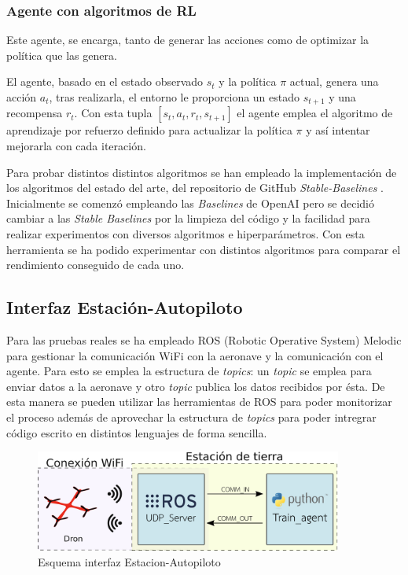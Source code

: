  \subsubsection{Agente con algoritmos de RL}
 Este agente, se encarga, tanto de generar las acciones como de optimizar la política que las genera.
 
 
 El agente, basado en el estado observado $s_t$ y la política $\pi$ actual, genera una acción $a_t$, tras realizarla, el entorno le proporciona un estado $s_{t+1}$ y una recompensa $r_t$.
 Con esta tupla $[s_t,a_t,r_t,s_{t+1}]$ el agente emplea el algoritmo de aprendizaje por refuerzo definido para actualizar la política $\pi$ y así intentar mejorarla con cada iteración. 

Para probar distintos distintos algoritmos se han empleado la implementación de los algoritmos del estado del arte, del repositorio de GitHub \textit{Stable-Baselines} \cite{stable-baselines}. Inicialmente se comenzó empleando las \textit{Baselines} de OpenAI \cite{OpenAIbaselines} pero se decidió cambiar a las \textit{Stable Baselines} por la limpieza del código y la facilidad para realizar experimentos con diversos algoritmos e hiperparámetros. Con esta herramienta se ha podido experimentar con distintos algoritmos para comparar el rendimiento conseguido de cada uno.


\subsection{Interfaz Estación-Autopiloto}

Para las pruebas reales se ha empleado ROS (Robotic Operative System) Melodic para gestionar la comunicación WiFi con la aeronave y la comunicación con el agente. Para esto se emplea la estructura de \textit{topics}: un \textit{topic} se emplea para enviar datos a la aeronave y otro \textit{topic} publica los datos recibidos por ésta. De esta manera se pueden utilizar las herramientas de ROS para poder monitorizar el proceso además de aprovechar la estructura de \textit{topics} para poder intregrar código escrito en distintos lenguajes de forma sencilla.

\begin{figure}[htb!]
	\centering
	\includegraphics[width=0.9\textwidth]{software/Arquitectura}
	\caption{Esquema interfaz Estacion-Autopiloto}
	\label{hardware:esc_explicacion}
\end{figure}





